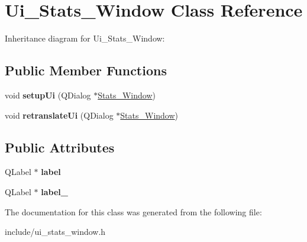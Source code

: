 \hypertarget{class_ui___stats___window}{}\section{Ui\+\_\+\+Stats\+\_\+\+Window Class Reference}
\label{class_ui___stats___window}


Inheritance diagram for Ui\+\_\+\+Stats\+\_\+\+Window\+:
\subsection*{Public Member Functions}
\begin{DoxyCompactItemize}
\item 
\mbox{\label{class_ui___stats___window_a368b99ae59968202a7eab450db2b5462}} 
void {\bfseries setup\+Ui} (Q\+Dialog $\ast$\hyperlink{class_stats___window}{Stats\+\_\+\+Window})
\item 
\mbox{\label{class_ui___stats___window_acf4fa33632ab91a2f9ed3a298a079bf6}} 
void {\bfseries retranslate\+Ui} (Q\+Dialog $\ast$\hyperlink{class_stats___window}{Stats\+\_\+\+Window})
\end{DoxyCompactItemize}
\subsection*{Public Attributes}
\begin{DoxyCompactItemize}
\item 
\mbox{\label{class_ui___stats___window_afc89e35856fc4150f5340be6a3046390}} 
Q\+Label $\ast$ {\bfseries label}
\item 
\mbox{\label{class_ui___stats___window_a15984ffdafefcaaa9d9631ffcb1e23ed}} 
Q\+Label $\ast$ {\bfseries label\+\_}
\end{DoxyCompactItemize}


The documentation for this class was generated from the following file\+:\begin{DoxyCompactItemize}
\item 
include/ui\+\_\+stats\+\_\+window.\+h\end{DoxyCompactItemize}

